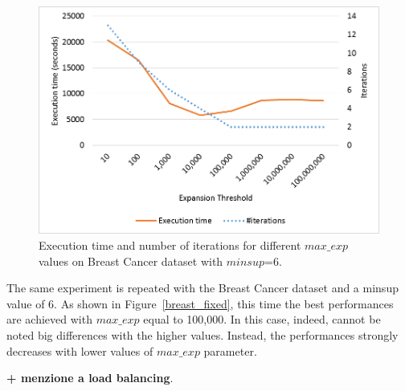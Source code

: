 \begin{figure}[!t]
\includegraphics[width=5in]{immagini_extension/breast_fixed.png}
\caption{Execution time and number of iterations for different $max\_exp$ values on Breast Cancer dataset with $minsup$=6.
}
\label{pems_fixed}
\end{figure}

The same experiment is repeated with the Breast Cancer dataset and a minsup value of 6. As shown in Figure~\ref{breast_fixed}, this time the best performances are achieved with $max\_exp$ equal to 100,000. In this case, indeed, cannot be noted big differences with the higher values. Instead, the performances strongly decreases with lower values of $max\_exp$ parameter.



\textbf{+ menzione a load balancing}.







